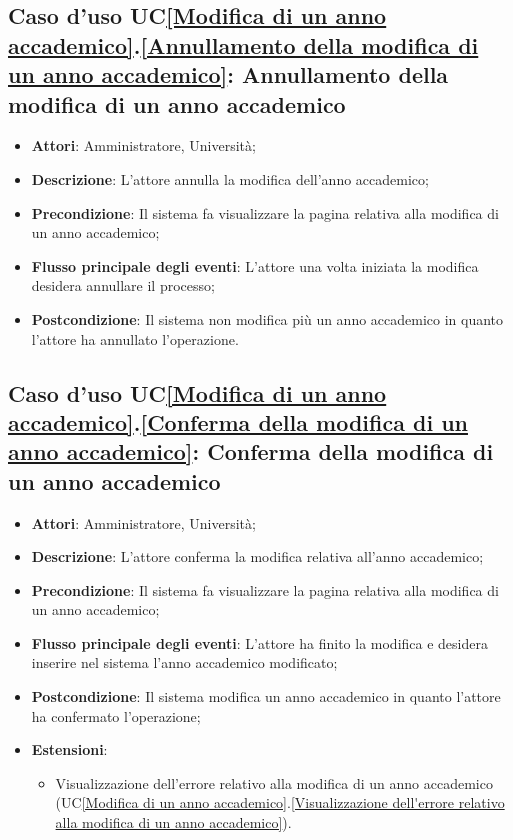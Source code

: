\subsection{Caso d'uso UC\ref{Modifica di un anno accademico}.\ref{Annullamento della modifica di un anno accademico}: Annullamento della modifica di un anno accademico}
\begin{itemize}
	\item \textbf{Attori}: Amministratore, Università;
	\item \textbf{Descrizione}: L'attore annulla la modifica dell'anno accademico;
	\item \textbf{Precondizione}: Il sistema fa visualizzare la pagina relativa alla modifica di un anno accademico;
	\item \textbf{Flusso principale degli eventi}: L'attore una volta iniziata la modifica desidera annullare il processo;
	\item \textbf{Postcondizione}: Il sistema non modifica più un anno accademico in quanto l'attore ha annullato l'operazione.
\end{itemize}

\subsection{Caso d'uso UC\ref{Modifica di un anno accademico}.\ref{Conferma della modifica di un anno accademico}: Conferma della modifica di un anno accademico}
\begin{itemize}
	\item \textbf{Attori}: Amministratore, Università;
	\item \textbf{Descrizione}: L'attore conferma la modifica relativa all'anno accademico;
	\item \textbf{Precondizione}: Il sistema fa visualizzare la pagina relativa alla modifica di un anno accademico;
	\item \textbf{Flusso principale degli eventi}: L'attore ha finito la modifica e desidera inserire nel sistema l'anno accademico modificato;
	\item \textbf{Postcondizione}: Il sistema modifica un anno accademico in quanto l'attore ha confermato l'operazione;
	\item \textbf{Estensioni}:
	\begin{itemize}
		\item Visualizzazione dell'errore relativo alla modifica di un anno accademico (UC\ref{Modifica di un anno accademico}.\ref{Visualizzazione dell'errore relativo alla modifica di un anno accademico}).
	\end{itemize}
\end{itemize}

